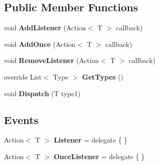 \subsection*{Public Member Functions}
\begin{DoxyCompactItemize}
\item 
\hypertarget{classstrange_1_1extensions_1_1signal_1_1impl_1_1_signal_3_01_t_01_4_a991a5ce3025d888edad1d7076ea33d3f}{void {\bfseries Add\-Listener} (Action$<$ T $>$ callback)}\label{classstrange_1_1extensions_1_1signal_1_1impl_1_1_signal_3_01_t_01_4_a991a5ce3025d888edad1d7076ea33d3f}

\item 
\hypertarget{classstrange_1_1extensions_1_1signal_1_1impl_1_1_signal_3_01_t_01_4_acb48a910ab2fe8896aa5608303716da9}{void {\bfseries Add\-Once} (Action$<$ T $>$ callback)}\label{classstrange_1_1extensions_1_1signal_1_1impl_1_1_signal_3_01_t_01_4_acb48a910ab2fe8896aa5608303716da9}

\item 
\hypertarget{classstrange_1_1extensions_1_1signal_1_1impl_1_1_signal_3_01_t_01_4_a33b1c75ada638f08c4917acd33786973}{void {\bfseries Remove\-Listener} (Action$<$ T $>$ callback)}\label{classstrange_1_1extensions_1_1signal_1_1impl_1_1_signal_3_01_t_01_4_a33b1c75ada638f08c4917acd33786973}

\item 
\hypertarget{classstrange_1_1extensions_1_1signal_1_1impl_1_1_signal_3_01_t_01_4_af2ac0df6bbbc57ffd333f756369f39ac}{override List$<$ Type $>$ {\bfseries Get\-Types} ()}\label{classstrange_1_1extensions_1_1signal_1_1impl_1_1_signal_3_01_t_01_4_af2ac0df6bbbc57ffd333f756369f39ac}

\item 
\hypertarget{classstrange_1_1extensions_1_1signal_1_1impl_1_1_signal_3_01_t_01_4_a1d30615b10192fbbdd06072d2f55e9c2}{void {\bfseries Dispatch} (T type1)}\label{classstrange_1_1extensions_1_1signal_1_1impl_1_1_signal_3_01_t_01_4_a1d30615b10192fbbdd06072d2f55e9c2}

\end{DoxyCompactItemize}
\subsection*{Events}
\begin{DoxyCompactItemize}
\item 
\hypertarget{classstrange_1_1extensions_1_1signal_1_1impl_1_1_signal_3_01_t_01_4_af1bbc7b0689d6724b0cca023126a6f3c}{Action$<$ T $>$ {\bfseries Listener} = delegate \{ \}}\label{classstrange_1_1extensions_1_1signal_1_1impl_1_1_signal_3_01_t_01_4_af1bbc7b0689d6724b0cca023126a6f3c}

\item 
\hypertarget{classstrange_1_1extensions_1_1signal_1_1impl_1_1_signal_3_01_t_01_4_a7c84b9b88096c374119b33eae72c90ec}{Action$<$ T $>$ {\bfseries Once\-Listener} = delegate \{ \}}\label{classstrange_1_1extensions_1_1signal_1_1impl_1_1_signal_3_01_t_01_4_a7c84b9b88096c374119b33eae72c90ec}

\end{DoxyCompactItemize}


